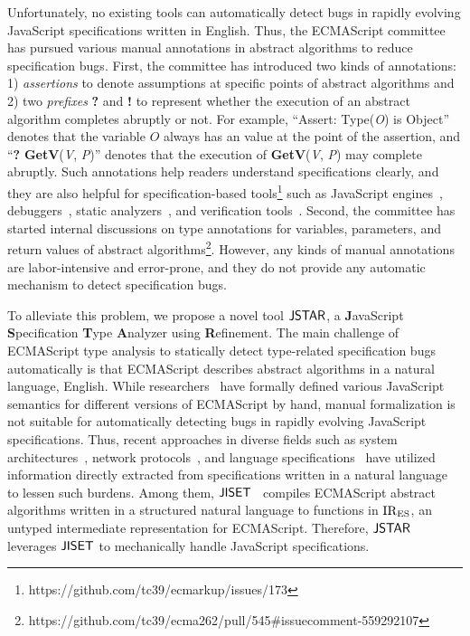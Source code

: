 Unfortunately, no existing tools can automatically detect bugs in
rapidly evolving JavaScript specifications written in English. Thus,
the ECMAScript committee has pursued various manual annotations in
abstract algorithms to reduce specification bugs.
First, the committee has introduced two kinds of annotations: 1)
\textit{assertions} to denote assumptions at specific points of abstract
algorithms and 2) two \textit{prefixes} \textbf{?} and \textbf{!} to
represent whether the execution of an abstract algorithm completes
abruptly or not. For example, ``Assert: Type(\textit{O}) is Object'' denotes that
the variable $\textit{O}$ always has an  value at the
point of the assertion, and ``\textbf{?} \textbf{GetV}(\textit{V}, \textit{P})'' denotes that
the execution of \textbf{GetV}(\textit{V}, \textit{P}) may complete abruptly.
Such annotations help readers understand specifications clearly, and
they are also helpful for specification-based
tools\footnote{https://github.com/tc39/ecmarkup/issues/173} such as JavaScript
engines~\cite{v8, graaljs, qjs, moddable}, debuggers~\cite{jsexplain}, static
analyzers~\cite{safe, tajs, jsai, wala}, and verification tools~\cite{javert,
javert2}.
Second, the committee has started internal discussions on type
annotations for variables, parameters, and return values of abstract
algorithms\footnote{https://github.com/tc39/ecma262/pull/545\#issuecomment-559292107}.
However, any kinds of manual annotations are labor-intensive and
error-prone, and they do not provide any automatic mechanism to detect
specification bugs.

To alleviate this problem, we propose a novel tool $\tool$, a \textbf{J}avaScript
\textbf{S}pecification \textbf{T}ype \textbf{A}nalyzer using
\textbf{R}efinement. The main challenge of ECMAScript type analysis to
statically detect type-related specification bugs automatically is
that ECMAScript describes abstract algorithms in a natural language,
English.  While researchers~\cite{lambdajs, jscert, kjs}
have formally defined various JavaScript semantics for different
versions of ECMAScript by hand, manual formalization is not suitable for
automatically detecting bugs in rapidly evolving JavaScript specifications. 
Thus, recent approaches in diverse fields such as system architectures~\cite{x86, arm},
network protocols~\cite{basespec}, and language specifications~\cite{spectest, javadoc}
have utilized information directly extracted from specifications written in a natural language
to lessen such burdens.
Among them, $\jiset$~\cite{jiset} compiles ECMAScript abstract algorithms written in
a structured natural language to functions in ${\text{IR}_\text{ES}}$, an untyped
intermediate representation for ECMAScript.
Therefore, $\tool$ leverages $\jiset$ to mechanically handle JavaScript specifications.



